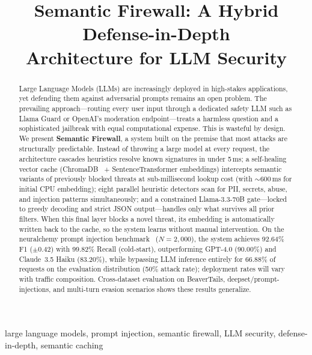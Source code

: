 \documentclass[conference]{IEEEtran}
\begin{document}
\title{Semantic Firewall: A Hybrid Defense-in-Depth\\Architecture for LLM Security}

\author{}

\maketitle

\begin{abstract}
Large Language Models (LLMs) are increasingly deployed in high-stakes
applications, yet defending them against adversarial prompts remains
an open problem. The prevailing approach---routing every user input
through a dedicated safety LLM such as Llama Guard or OpenAI's
moderation endpoint---treats a harmless question and a sophisticated
jailbreak with equal computational expense. This is wasteful by
design. We present \textbf{Semantic Firewall}, a system built on the
premise that most attacks are structurally predictable. Instead of
throwing a large model at every request, the architecture cascades
heuristics resolve known signatures in under 5\,ms; a self-healing
vector cache (ChromaDB~\cite{chromadb} + SentenceTransformer embeddings) intercepts
semantic variants of previously blocked threats at sub-millisecond
lookup cost (with $\sim$600\,ms for initial CPU embedding); eight
parallel heuristic detectors scan for PII, secrets,
abuse, and injection patterns simultaneously; and a constrained
Llama-3.3-70B gate---locked to greedy decoding and strict JSON
output---handles only what survives all prior filters. When this
final layer blocks a novel threat, its embedding is automatically
written back to the cache, so the system learns without manual
intervention. On the neuralchemy prompt injection benchmark~\cite{neuralchemy}
($N{=}2{,}000$), the system achieves 92.64\% F1 ($\pm$0.42) with
99.82\% Recall (cold-start), outperforming GPT-4.0 (90.00\%) and
Claude~3.5 Haiku (83.20\%), while bypassing LLM inference entirely for
66.88\% of requests on the evaluation distribution (50\% attack rate);
deployment rates will vary with traffic composition. Cross-dataset
evaluation on BeaverTails, deepset/prompt-injections, and multi-turn
evasion scenarios shows these results generalize.
\end{abstract}

\begin{IEEEkeywords}
large language models, prompt injection, semantic firewall, LLM
security, defense-in-depth, semantic caching
\end{IEEEkeywords}
\end{document}
